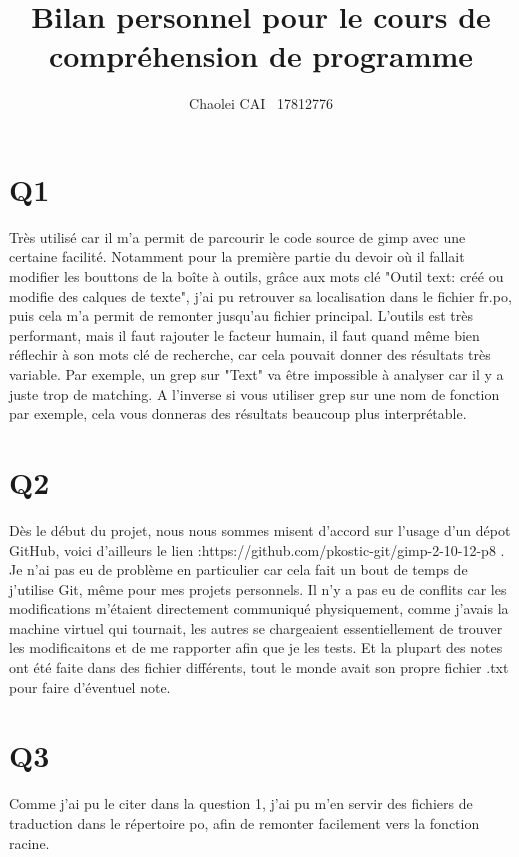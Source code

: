 \documentclass[12pt, letterpaper]{article}
\title{Bilan personnel pour le cours de compréhension de programme}
\author{Chaolei CAI \ 17812776}
\begin{document}
\begin{titlepage}
    \maketitle
\end{titlepage}

\section{Q1}
Très utilisé car il m'a permit de parcourir le code source de gimp avec une certaine facilité. Notamment pour la première partie du devoir 
où il fallait modifier les bouttons de la boîte à outils, grâce aux mots clé "Outil text: créé ou modifie des calques de texte", j'ai pu retrouver sa localisation dans le fichier fr.po, puis cela m'a permit de remonter jusqu'au fichier principal.
L'outils est très performant, mais il faut rajouter le facteur humain, il faut quand même bien réflechir à son mots clé de recherche, car cela pouvait donner des résultats très variable. 
Par exemple, un grep sur "Text" va être impossible à analyser car il y a juste trop de matching. A l'inverse si vous utiliser grep sur une nom de fonction par exemple, cela vous donneras des résultats beaucoup plus interprétable.

\section{Q2}
Dès le début du projet, nous nous sommes misent d'accord sur l'usage d'un dépot GitHub, voici d'ailleurs le lien :https://github.com/pkostic-git/gimp-2-10-12-p8 .
Je n'ai pas eu de problème en particulier car cela fait un bout de temps de j'utilise Git, même pour mes projets personnels. Il n'y a pas eu de conflits car les modifications m'étaient directement communiqué physiquement, comme j'avais la machine virtuel qui tournait, les autres se chargeaient essentiellement de trouver les modificaitons et de me rapporter afin que je les tests. 
Et la plupart des notes ont été faite dans des fichier différents, tout le monde avait son propre fichier .txt pour faire d'éventuel note.

\section{Q3}
Comme j'ai pu le citer dans la question 1, j'ai pu m'en servir des fichiers de traduction dans le répertoire po, afin de remonter facilement vers la fonction racine.
\end{document}
